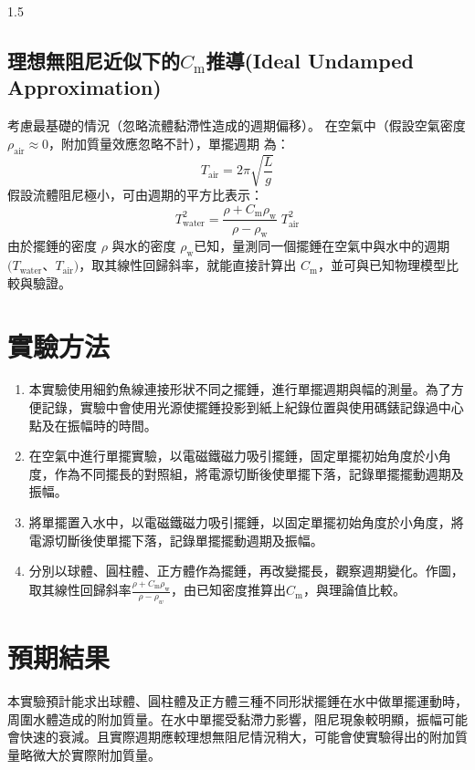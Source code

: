 \documentclass[10pt]{article}
\begin{document}
\begin{spacing}{1.5}
\begin{framed}
\subsection{理想無阻尼近似下的\texorpdfstring{$C_\text{m}$}{}推導(Ideal Undamped Approximation)}
考慮最基礎的情況（忽略流體黏滯性造成的週期偏移）。
在空氣中（假設空氣密度 $\rho_{\text{air}} \approx 0$，附加質量效應忽略不計），單擺週期 為：
$$T_{\text{air}}=2\pi \sqrt{\frac{L}{g}}$$
假設流體阻尼極小，可由週期的平方比表示：
$$T^2_{\text{water}}= \frac{\rho + C_\text{m} \rho_\text{w}}{\rho - \rho_\text{w}}\;T^2_{\text{air}}$$
由於擺錘的密度 $\rho$ 與水的密度 $\rho_\text{w}$已知，量測同一個擺錘在空氣中與水中的週期 $(T_{\text{water}}$、$T_{\text{air}})$，取其線性回歸斜率，就能直接計算出 $C_\text{m}$，並可與已知物理模型比較與驗證。

\section{實驗方法}
\begin{enumerate}
\item 本實驗使用細釣魚線連接形狀不同之擺錘，進行單擺週期與幅的測量。為了方便記錄，實驗中會使用光源使擺錘投影到紙上紀錄位置與使用碼錶記錄過中心點及在振幅時的時間。
\item 在空氣中進行單擺實驗，以電磁鐵磁力吸引擺錘，固定單擺初始角度於小角度，作為不同擺長的對照組，將電源切斷後使單擺下落，記錄單擺擺動週期及振幅。
\item 將單擺置入水中，以電磁鐵磁力吸引擺錘，以固定單擺初始角度於小角度，將電源切斷後使單擺下落，記錄單擺擺動週期及振幅。
\item 分別以球體、圓柱體、正方體作為擺錘，再改變擺長，觀察週期變化。作圖，取其線性回歸斜率$ \frac{\rho + C_\text{m} \rho_\text{w}}{\rho - \rho_w}$，由已知密度推算出$C_\text{m}$，與理論值比較。
\end{enumerate}
\section{預期結果}
本實驗預計能求出球體、圓柱體及正方體三種不同形狀擺錘在水中做單擺運動時，周圍水體造成的附加質量。在水中單擺受黏滯力影響，阻尼現象較明顯，振幅可能會快速的衰減。且實際週期應較理想無阻尼情況稍大，可能會使實驗得出的附加質量略微大於實際附加質量。
\end{framed}
\end{spacing}
\end{document}
